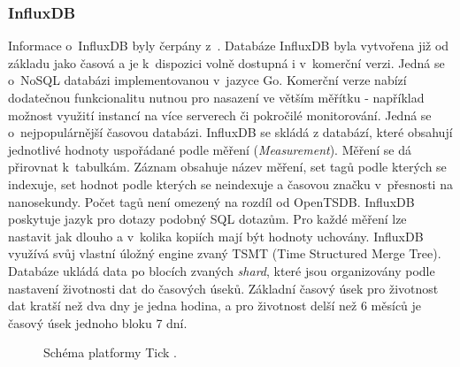 \subsubsection*{InfluxDB}
Informace o~InfluxDB byly čerpány z~\cite{Influx}. Databáze InfluxDB byla vytvořena již od základu jako časová a je k~dispozici volně dostupná i v~komerční verzi. Jedná se o~NoSQL databázi implementovanou v~jazyce Go. Komerční verze nabízí dodatečnou funkcionalitu nutnou pro nasazení ve větším měřítku - například možnost využití instancí na více serverech či pokročilé monitorování. Jedná se o~nejpopulárnější časovou databázi. InfluxDB se skládá z databází, které obsahují jednotlivé hodnoty uspořádané podle měření (\textit{Measurement}). Měření se dá přirovnat k~tabulkám. Záznam obsahuje název měření, set tagů podle kterých se indexuje, set hodnot podle kterých se neindexuje a časovou značku v~přesnosti na nanosekundy. Počet tagů není omezený na rozdíl od OpenTSDB. InfluxDB poskytuje jazyk pro dotazy podobný SQL dotazům. Pro každé měření lze nastavit jak dlouho a v~kolika kopiích mají být hodnoty uchovány. InfluxDB využívá svůj vlastní úložný engine zvaný TSMT (Time Structured Merge Tree). Databáze ukládá data po blocích zvaných \textit{shard}, které jsou organizovány podle nastavení životnosti dat do časových úseků. Základní časový úsek pro životnost dat kratší než dva dny je jedna hodina, a pro životnost delší než 6 měsíců je časový úsek jednoho bloku 7 dní.

\begin{figure}%
  \centering
  \caption{Schéma platformy Tick \cite{Influx}.}\label{pic:tick}
\end{figure}

